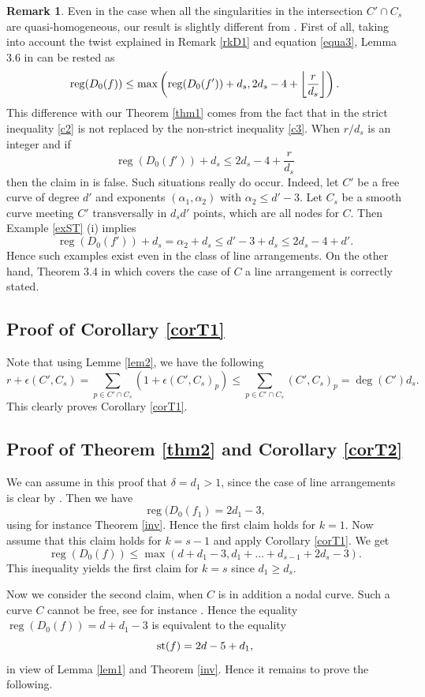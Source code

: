 \documentclass[12pt]{amsart}
\theoremstyle{plain}
\theoremstyle{definition}
\newtheorem{rk}[subsection]{Remark}
\numberwithin{equation}{section}
\newcommand{\al}{{\alpha}}
\newcommand{\de}{{\delta}}
\DeclareMathOperator{\reg}{reg}
\DeclarePairedDelimiter\floor{\lfloor}{\rfloor}
\begin{document}
\begin{rk}
\label{rkS}
Even in the case when all the singularities in the intersection $C' \cap C_s$ are quasi-homogeneous, our result is slightly different from 
\cite[Lemma 3.6]{STY}. First of all, taking into account the twist explained in Remark \ref{rkD1} and equation \eqref{equa3}, Lemma 3.6 in \cite{STY} can be rested as
$$\reg(D_0(f)) \leq \max \left ( \reg(D_0(f'))+d_s, 2d_s-4 + \floor*{\frac{r}{d_s}}\right ).$$
This difference with our Theorem \ref{thm1} comes from the fact that in
\cite{STY} the strict inequality \eqref{c2} is not replaced by the non-strict inequality \eqref{c3}. When $r/d_s$ is an integer and if
$$\reg(D_0(f'))+d_s \leq 2d_s-4 + \frac{r}{d_s}$$
then the claim in \cite[Lemma 3.6]{STY} is false. Such situations really do occur. Indeed, let $C'$ be a free curve of degree $d'$ and exponents
$(\al_1,\al_2)$ with $\al_2 \leq d'-3$. Let $C_s$ be a smooth curve meeting $C'$ transversally in $d_sd'$ points, which are all nodes for $C$. 
Then Example \ref{exST} (i) implies
$$\reg(D_0(f'))+d_s =\al_2+d_s \leq d'-3+d_s \leq 2d_s-4+d'.$$
Hence such examples exist even in the class of line arrangements.
On the other hand, Theorem 3.4 in \cite{Sch0} which covers the case of 
$C$ a line arrangement is correctly stated.
\end{rk}

\subsection{Proof of Corollary   \ref{corT1}} 
Note that using Lemme \ref{lem2}, we have the following
$$r+\epsilon(C',C_s)=\sum_{p\in C' \cap C_s}(1+\epsilon(C',C_s)_p) \leq \sum_{p\in C' \cap C_s} (C',C_s)_p=\deg(C') d_s.$$
This clearly proves Corollary   \ref{corT1}.
\subsection{Proof of Theorem  \ref{thm2} and Corollary   \ref{corT2}} 
We can assume in this proof that $\de=d_1>1$, since the case of line arrangements is clear by \cite{Sch0}. 
Then we have
$$\reg (D_0(f_1)=2d_1-3,$$
using for instance Theorem \ref{inv}. Hence the first claim holds for $k=1$. Now assume that this claim holds for $k=s-1$ and apply Corollary \ref{corT1}. We get
$$\reg (D_0(f)) \leq \max(d+d_1-3, d_1+ \ldots +d_{s-1}+2d_s-3).$$
This inequality yields the first claim for $k=s$ since $d_1 \geq d_s$.

Now we consider the second claim, when $C$ is in addition a nodal curve. Such a curve $C$ cannot be free, see for instance \cite{DPo}. 
Hence the equality $\reg (D_0(f)) = d+d_1-3$
is equivalent to the equality
\begin{equation}
\label{c13}
{\rm st}(f)=2d-5+d_1,
\end{equation}
in view of Lemma \ref{lem1} and Theorem \ref{inv}. Hence it remains to prove the following.
\end{document}
